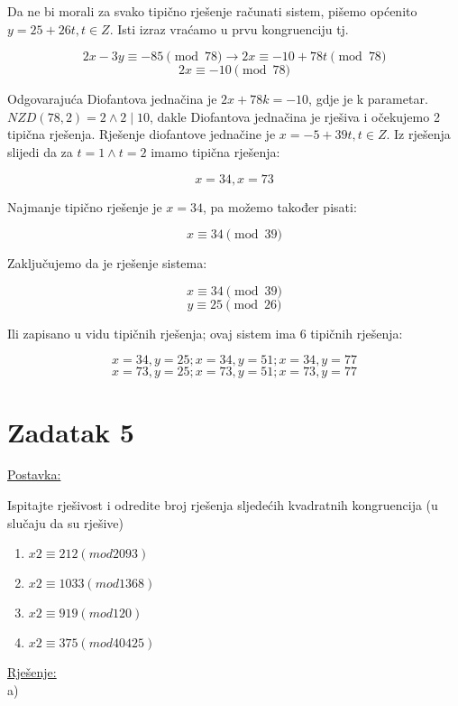 \documentclass[12pt]{article}
\begin{document}
Da ne bi morali za svako tipično rješenje računati sistem, pišemo općenito $y = 25 + 26t, t \in Z$. Isti izraz vraćamo u prvu kongruenciju tj.

$$2x - 3y \equiv -85 \pmod{78} \to 2x \equiv -10 + 78t \pmod{78}$$
$$2x \equiv -10 \pmod{78}$$\vspace{1mm}

Odgovarajuća Diofantova jednačina je $2x + 78k = -10$, gdje je k parametar. $NZD(78, 2) = 2 \land 2 \mid 10$, dakle Diofantova jednačina je rješiva i očekujemo 2 tipična rješenja. Rješenje diofantove jednačine je $x = -5 + 39t, t \in Z$. Iz rješenja slijedi da za $t = 1 \land t = 2$ imamo tipična rješenja:

$$x = 34, x = 73$$\vspace{1mm}

Najmanje tipično rješenje je $x = 34$, pa možemo također pisati:

$$x \equiv 34 \pmod{39}$$\vspace{1mm}

Zaključujemo da je rješenje sistema:

$$x \equiv 34 \pmod{39}$$
$$y \equiv 25 \pmod{26}$$\vspace{1mm}

Ili zapisano u vidu tipičnih rješenja; ovaj sistem ima 6 tipičnih rješenja:

$$x = 34, y = 25; x = 34, y = 51; x = 34, y = 77$$
$$x = 73, y = 25; x = 73, y = 51; x = 73, y = 77$$

\newpage

\section*{Zadatak 5\label{Z5} }

\underline{Postavka:}

Ispitajte rješivost i odredite broj rješenja sljedećih kvadratnih kongruencija (u slučaju da su rješive)

\begin{enumerate}
\item $x2 \equiv 212 (mod 2093)$
\item $x2 \equiv 1033 (mod 1368)$
\item $x2 \equiv 919 (mod 120)$
\item $x2 \equiv 375 (mod 40425)$
\end{enumerate}

\underline{Rješenje:}\\

\hspace{6.8mm}a)
\end{document}
